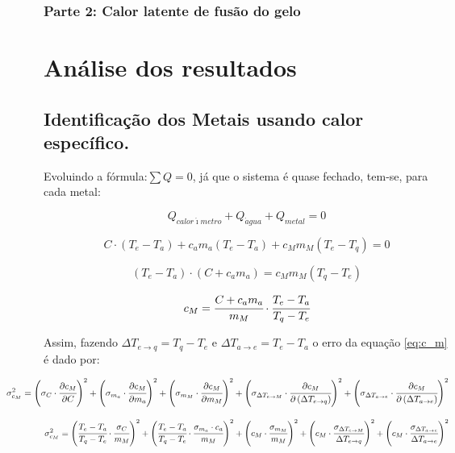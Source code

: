 \documentclass[a4paper]{article}
\begin{document}
			\subsubsection{Parte 2: Calor latente de fusão do gelo}


	\section{Análise dos resultados}


		\subsection{Identificação dos Metais usando calor específico.}

			Evoluindo a fórmula:$\sum Q=0$, já que o sistema é quase fechado,
			tem-se, para cada metal:

			\begin{equation}
				Q_{calor\acute{\imath}metro}+Q_{\acute{a}gua}+Q_{metal}=0
			\end{equation}


			\[
				C\cdot\left(T_{e}-T_{a}\right)+c_{a}m_{a}\left(T_{e}-T_{a}\right)+c_{M}m_{M}\left(T_{e}-T_{q}\right)=0
			\]


			\[
				\left(T_{e}-T_{a}\right)\cdot\left(C+c_{a}m_{a}\right)=c_{M}m_{M}\left(T_{q}-T_{e}\right)
			\]


			\begin{equation}
				c_{M}=\cfrac{C+c_{a}m_{a}}{m_{M}}\cdot\cfrac{T_{e}-T_{a}}{T_{q}-T_{e}}\label{eq:c_m}
			\end{equation}


			Assim, fazendo $\Delta T_{e\rightarrow q}=T_{q}-T_{e}$ e $\Delta T_{a\rightarrow e}=T_{e}-T_{a}$
			o erro da equação \eqref{eq:c_m} é dado por:

		    
		    \begin{equation}
				\hspace{-1,5cm}
				\sigma_{c_{M}}^{2}=\left(\sigma_{C}\cdot\cfrac{\partial c_{M}}{\partial C}\right)^{2}+\left(\sigma_{m_{a}}\cdot\cfrac{\partial c_{M}}{\partial m_{a}}\right)^{2}+\left(\sigma_{m_{M}}\cdot\cfrac{\partial c_{M}}{\partial m_{M}}\right)^{2}+\left(\sigma_{\Delta T_{e\rightarrow M}}\cdot\cfrac{\partial c_{M}}{\partial\left(\Delta T_{e\rightarrow q}\right)}\right)^{2}+\left(\sigma_{\Delta T_{a\rightarrow e}}\cdot\cfrac{\partial c_{M}}{\partial\left(\Delta T_{a\rightarrow e}\right)}\right)^{2}
			\end{equation}


			\[
				\sigma_{c_{M}}^{2}=\left(\cfrac{T_{e}-T_{a}}{T_{q}-T_{e}}\cdot\cfrac{\sigma_{C}}{m_{M}}\right)^{2}+\left(\cfrac{T_{e}-T_{a}}{T_{q}-T_{e}}\cdot\cfrac{\sigma_{m_{a}}\cdot c_{a}}{m_{M}}\right)^{2}+\left(c_{M}\cdot\cfrac{\sigma_{m_{M}}}{m_{M}}\right)^{2}+\left(c_{M}\cdot\cfrac{\sigma_{\Delta T_{e\rightarrow M}}}{\Delta T_{e\rightarrow q}}\right)^{2}+\left(c_{M}\cdot\cfrac{\sigma_{\Delta T_{a\rightarrow e}}}{\Delta T_{a\rightarrow e}}\right)^{2}
			\]
\end{document}
